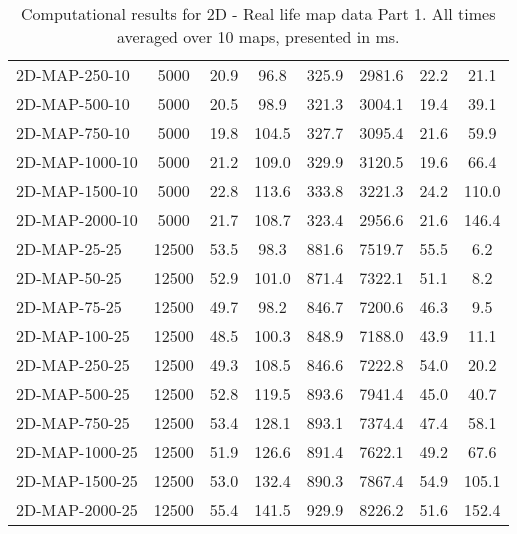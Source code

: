 \documentclass{article}
\begin{document}
\begin{table}[h]
\begin{center}
\begin{tabular}{|l||c|c|c|c|c|c|c|}
        2D-MAP-250-10 & 5000 & 20.9 & 96.8 & 325.9 & 2981.6 & 22.2 & 21.1 \\
        2D-MAP-500-10 & 5000 & 20.5 & 98.9 & 321.3 & 3004.1 & 19.4 & 39.1 \\
        2D-MAP-750-10 & 5000 & 19.8 & 104.5 & 327.7 & 3095.4 & 21.6 & 59.9 \\
        2D-MAP-1000-10 & 5000 & 21.2 & 109.0 & 329.9 & 3120.5 & 19.6 & 66.4 \\
        2D-MAP-1500-10 & 5000 & 22.8 & 113.6 & 333.8 & 3221.3 & 24.2 & 110.0 \\
        2D-MAP-2000-10 & 5000 & 21.7 & 108.7 & 323.4 & 2956.6 & 21.6 & 146.4 \\
        \hline
        2D-MAP-25-25 & 12500 & 53.5 & 98.3 & 881.6 & 7519.7 & 55.5 & 6.2 \\
        2D-MAP-50-25 & 12500 & 52.9 & 101.0 & 871.4 & 7322.1 & 51.1 & 8.2 \\
        2D-MAP-75-25 & 12500 & 49.7 & 98.2 & 846.7 & 7200.6 & 46.3 & 9.5 \\
        2D-MAP-100-25 & 12500 & 48.5 & 100.3 & 848.9 & 7188.0 & 43.9 & 11.1 \\
        2D-MAP-250-25 & 12500 & 49.3 & 108.5 & 846.6 & 7222.8 & 54.0 & 20.2 \\
        2D-MAP-500-25 & 12500 & 52.8 & 119.5 & 893.6 & 7941.4 & 45.0 & 40.7 \\
        2D-MAP-750-25 & 12500 & 53.4 & 128.1 & 893.1 & 7374.4 & 47.4 & 58.1 \\
        2D-MAP-1000-25 & 12500 & 51.9 & 126.6 & 891.4 & 7622.1 & 49.2 & 67.6 \\
        2D-MAP-1500-25 & 12500 & 53.0 & 132.4 & 890.3 & 7867.4 & 54.9 & 105.1 \\
        2D-MAP-2000-25 & 12500 & 55.4 & 141.5 & 929.9 & 8226.2 & 51.6 & 152.4 \\
        \hline
    \end{tabular}
    \caption{Computational results for 2D - Real life map data Part 1. All times averaged over 10 maps, presented in ms.}
\end{center}
\end{table}
\end{document}
